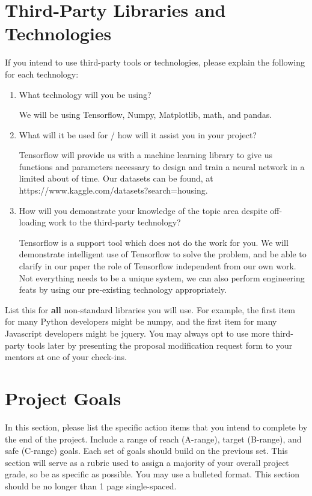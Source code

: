 \documentclass[]{article}
\begin{document}
\section{Third-Party Libraries and Technologies}

If you intend to use third-party tools or technologies, please explain the following for each technology:

\begin{enumerate}
	\item What technology will you be using?
        
        We will be using Tensorflow, Numpy, Matplotlib, math, and pandas.
        
        \item What will it be used for / how will it assist you in your project?
        
        Tensorflow will provide us with a machine learning library to give us functions and parameters necessary to design and train a neural network in a limited about of time.
        Our datasets can be found, at https://www.kaggle.com/datasets?search=housing.
        
        \item How will you demonstrate your knowledge of the topic area despite off-loading work to the third-party technology?
        
        Tensorflow is a support tool which does not do the work for you.  We will demonstrate intelligent use of Tensorflow to solve the problem, and be able to clarify in our paper the role of Tensorflow independent from our own work.  Not everything needs to be a unique system, we can also perform engineering feats by using our pre-existing technology appropriately.
\end{enumerate}

List this for \textbf{all} non-standard libraries you will use. For example, the first item for many Python developers might be numpy, and the first item for many Javascript developers might be jquery. You may always opt to use more third-party tools later by presenting the proposal modification request form to your mentors at one of your check-ins.

\section{Project Goals}

In this section, please list the specific action items that you intend to complete by the end of the project. Include a range of reach (A-range), target (B-range), and safe (C-range) goals. Each set of goals should build on the previous set. This section will serve as a rubric used to assign a majority of your overall project grade, so be as specific as possible. You may use a bulleted format. This section should be no longer than 1 page single-spaced.
\end{document}
